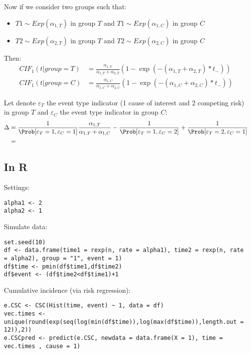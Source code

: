 \documentclass{article}
\begin{document}
\bigskip

Now if we consider two groups such that:
\begin{itemize}
\item \(T1 \sim Exp(\alpha_{1,T})\) in group \(T\) and \(T1 \sim Exp(\alpha_{1,C})\) in group \(C\)
\item \(T2 \sim Exp(\alpha_{2,T})\) in group \(T\) and \(T2 \sim Exp(\alpha_{2,C})\) in group \(C\)
\end{itemize}

Then:
\begin{align*}
CIF_1(t|group = T) &= \frac{\alpha_{1,T}}{\alpha_{1,T} + \alpha_{2,T}} \left(1 - \exp(- (\alpha_{1,T} + \alpha_{2,T}) * t_-)\right) \\
CIF_1(t|group = C) &= \frac{\alpha_{1,C}}{\alpha_{1,C} + \alpha_{2,C}} \left(1 - \exp(- (\alpha_{1,C} + \alpha_{2,C}) * t_-)\right) 
\end{align*}

\bigskip

Let denote \(\varepsilon_T\) the event type indicator (1 cause of
interest and 2 competing risk) in group \(T\) and \(\varepsilon_C\)
the event type indicator in group \(C\):
\begin{align*}
\Delta &= \frac{1}{\Prob[\varepsilon_T=1,\varepsilon_C=1]} \frac{\alpha_{1,T}}{\alpha_{1,T}+\alpha_{1,C}}
- \frac{1}{\Prob[\varepsilon_T=1,\varepsilon_C=2]}
+ \frac{1}{\Prob[\varepsilon_T=2,\varepsilon_C=1]} \\
&=
\end{align*}

\subsection{In R}
\label{sec:org3bacfa5}

Settings:
\lstset{language=r,label= ,caption= ,captionpos=b,numbers=none}
\begin{lstlisting}
alpha1 <- 2
alpha2 <- 1
\end{lstlisting}

Simulate data:
\lstset{language=r,label= ,caption= ,captionpos=b,numbers=none}
\begin{lstlisting}
set.seed(10)
df <- data.frame(time1 = rexp(n, rate = alpha1), time2 = rexp(n, rate = alpha2), group = "1", event = 1)
df$time <- pmin(df$time1,df$time2)
df$event <- (df$time2<df$time1)+1
\end{lstlisting}

Cumulative incidence (via risk regression):
\lstset{language=r,label= ,caption= ,captionpos=b,numbers=none}
\begin{lstlisting}
e.CSC <- CSC(Hist(time, event) ~ 1, data = df)
vec.times <- unique(round(exp(seq(log(min(df$time)),log(max(df$time)),length.out = 12)),2))
e.CSCpred <- predict(e.CSC, newdata = data.frame(X = 1), time = vec.times , cause = 1)
\end{lstlisting}
\end{document}
